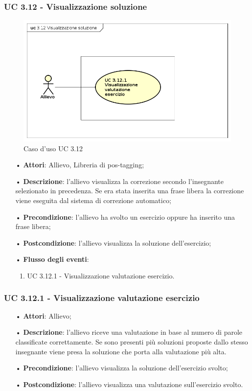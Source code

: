 \subsubsection{UC 3.12 - Visualizzazione soluzione}
\begin{figure}[H]
	\centering
	\includegraphics[width=17cm]{img/UC312.png} 
	\caption{Caso d'uso UC 3.12}\label{fig:312}
\end{figure}
\begin{itemize}
	\item[•]\textbf{Attori}: Allievo, Libreria di pos-tagging;
	\item[•]\textbf{Descrizione}: l'allievo visualizza la correzione secondo l'insegnante selezionato in precedenza. Se era stata inserita una frase libera la correzione viene eseguita dal sistema di correzione automatico;
	\item[•]\textbf{Precondizione}: l'allievo ha svolto un esercizio oppure ha inserito una frase libera;
	\item[•]\textbf{Postcondizione}: l'allievo visualizza la soluzione dell'esercizio;
	\item[•]\textbf{Flusso degli eventi}:
	\begin{enumerate}
		\item UC 3.12.1 - Visualizzazione valutazione esercizio.  
	\end{enumerate}
\end{itemize}


\subsubsection{UC 3.12.1 - Visualizzazione valutazione esercizio}   

\begin{itemize}
\item[•]\textbf{Attori}: Allievo;
\item[•]\textbf{Descrizione}: l'allievo riceve una valutazione in base al numero di parole classificate correttamente. Se sono presenti più soluzioni proposte dallo stesso insegnante viene presa la soluzione che porta alla valutazione più alta.
\item[•]\textbf{Precondizione}: l'allievo visualizza la soluzione dell'esercizio svolto;
\item[•]\textbf{Postcondizione}: l'allievo visualizza una valutazione sull'esercizio svolto.
\end{itemize}


